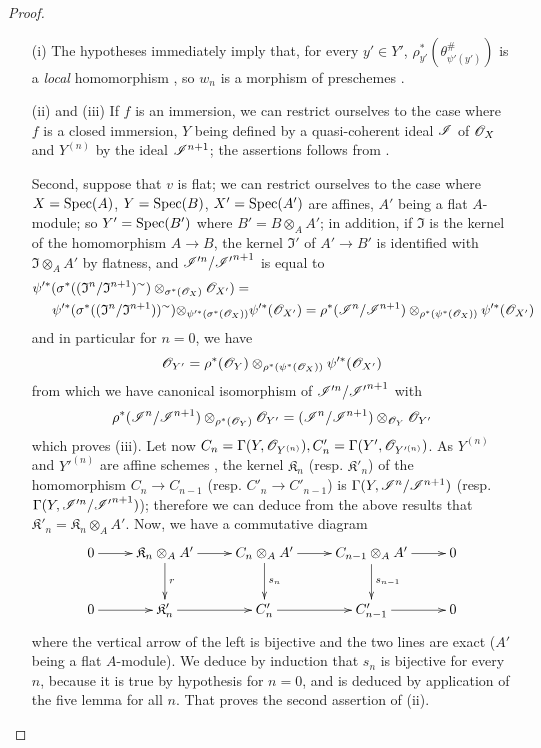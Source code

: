 \begin{proof}
\medskip\noindent
\begin{enumerate}
  \item[(i)] The hypotheses immediately imply that, for every $y' \in Y'$, $\rho_{y'}^*(\theta_{\psi'(y')}^\#)$ is a \emph{local} homomorphism , so $w_n$ is a morphism of preschemes .
  \item[(ii) and (iii)] If $f$ is an immersion, we can restrict ourselves to the case where $f$ is a closed immersion, $Y$ being defined by a quasi-coherent ideal $\mathscr{I}$ of $\mathscr{O}_X$ and $Y^{(n)}$ by the ideal $\mathscr{I}^{n+1}$;
  the assertions follows from .

  Second, suppose that $v$ is flat;
  we can restrict ourselves to the case where $X = \operatorname{Spec}(A)$, $Y = \operatorname{Spec}(B)$, $X' = \operatorname{Spec}(A')$ are affines, $A'$ being a flat $A$-module;
  so $Y' = \operatorname{Spec}(B')$ where $B' = B \otimes_A A'$;
  in addition, if $\mathfrak{I}$ is the kernel of the homomorphism $A \to B$, the kernel $\mathfrak{I'}$ of $A' \to B'$ is identified with $\mathfrak{I}\otimes_A A'$ by flatness, and $\mathscr{I}'^n/\mathscr{I'}^{n+1}$ is equal to
  \begin{align*}
    \psi'^*(\sigma^*((\mathfrak{I}^n/\mathfrak{I}^{n+1})^\sim) \otimes_{\sigma^*(\mathscr{O}_X)} \mathscr{O}_{X'}) =& \\
    \psi'^*(\sigma^*((\mathfrak{I}^n/\mathfrak{I}^{n+1} ))^\sim) \otimes_{\psi'^*(\sigma^*(\mathscr{O}_X))} &\psi'^*(\mathscr{O}_{X'}) = \rho^*(\mathscr{I}^n/\mathscr{I}^{n+1})\otimes_{\rho^*(\psi^*(\mathscr{O}_X))} \psi'^*(\mathscr{O}_{X'}) 
  \end{align*}
  and in particular for $n = 0$, we have
  \[
    \mathscr{O}_{Y'} = \rho^*(\mathscr{O}_Y) \otimes_{\rho^*(\psi^*(\mathscr{O}_X))} \psi'^*(\mathscr{O}_{X'})
  \]
  from which we have canonical isomorphism of $\mathscr{I}'^n/\mathscr{I'}^{n+1}$ with
  \[
    \rho^*(\mathscr{I}^n/\mathscr{I}^{n+1})\otimes_{\rho^*(\mathscr{O}_Y)} \mathscr{O}_{Y'} = (\mathscr{I}^n/\mathscr{I}^{n+1}) \otimes_{\mathscr{O}_Y} \mathscr{O}_{Y'}
  \]
  which proves (iii).
  Let now $C_n = \Gamma(Y, \mathscr{O}_{Y^{(n)}}), C'_n = \Gamma(Y', \mathscr{O}_{Y'^{(n)}})$.
  As $Y^{(n)}$ and $Y'^{(n)}$ are affine schemes , the kernel $\mathfrak{K}_n$ (resp. $\mathfrak{K}'_n$) of the homomorphism $C_n \to C_{n-1}$ (resp. $C'_n \to C'_{n-1}$) is $\Gamma(Y, \mathscr{I}^n/\mathscr{I}^{n+1})$ (resp. $\Gamma(Y, \mathscr{I}'^n/\mathscr{I'}^{n+1})$);
  therefore we can deduce from the above results that $\mathfrak{K}'_n = \mathfrak{K}_n \otimes_A A'$.
  Now, we have a commutative diagram
  \[
    \xymatrix{
      0 \ar[r] & \mathfrak{K}_n \ar[d]^-r\ar[r] \otimes_A A' & C_n \otimes_A A' \ar[d]^-{s_n}\ar[r] & C_{n-1} \otimes_A A' \ar[d]^-{s_{n-1}}\ar[r] & 0 \\
      0 \ar[r] & \mathfrak{K}'_n \ar[r] & C'_n \ar[r] & C'_{n-1} \ar[r] & 0
    }
  \]
  where the vertical arrow of the left is bijective and the two lines are exact ($A'$ being a flat $A$-module).
  We deduce by induction that $s_n$ is bijective for every $n$, because it is true by hypothesis for $n = 0$, and is deduced by application of the five lemma for all $n$.
  That proves the second assertion of (ii).
\end{enumerate}
\end{proof}

